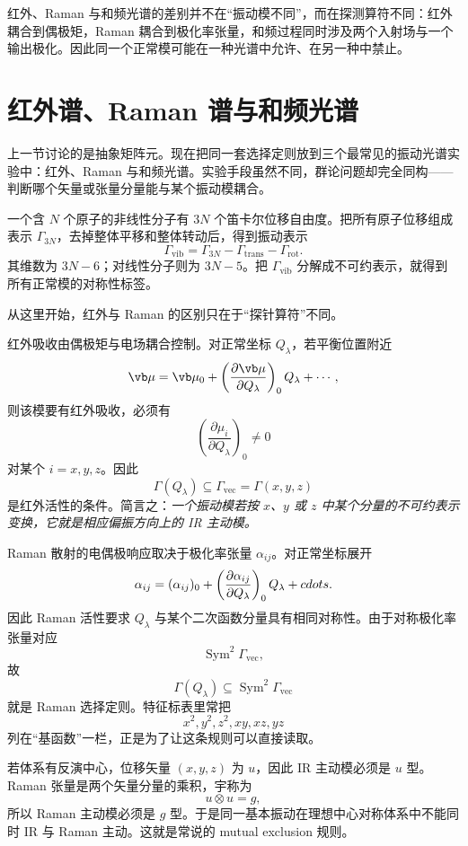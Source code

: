 红外、Raman 与和频光谱的差别并不在“振动模不同”，而在探测算符不同：红外耦合到偶极矩，Raman 耦合到极化率张量，和频过程同时涉及两个入射场与一个输出极化。因此同一个正常模可能在一种光谱中允许、在另一种中禁止。

\section{红外谱、Raman 谱与和频光谱}
\label{sec:ir-raman-sfg}

上一节讨论的是抽象矩阵元。现在把同一套选择定则放到三个最常见的振动光谱实验中：红外、Raman 与和频光谱。实验手段虽然不同，群论问题却完全同构——判断哪个矢量或张量分量能与某个振动模耦合。

一个含 $N$ 个原子的非线性分子有 $3N$ 个笛卡尔位移自由度。把所有原子位移组成表示 $\Gamma_{3N}$，去掉整体平移和整体转动后，得到振动表示
\[
\Gamma_{\mathrm{vib}}
=\Gamma_{3N}-\Gamma_{\mathrm{trans}}-\Gamma_{\mathrm{rot}}.
\label{eq:vibrational-representation}
\]
其维数为 $3N-6$；对线性分子则为 $3N-5$。把 $\Gamma_{\mathrm{vib}}$ 分解成不可约表示，就得到所有正常模的对称性标签。

从这里开始，红外与 Raman 的区别只在于“探针算符”不同。

红外吸收由偶极矩与电场耦合控制。对正常坐标 $Q_\lambda$，若平衡位置附近
\[
\vb\mu
=\vb\mu_0
+\left(\frac{\partial\vb\mu}{\partial Q_\lambda}\right)_0Q_\lambda+\cdots,
\]
则该模要有红外吸收，必须有
\[
\left(\frac{\partial\mu_i}{\partial Q_\lambda}\right)_0\neq0
\]
对某个 $i=x,y,z$。因此
\[
\Gamma(Q_\lambda)
\subseteq \Gamma_{\mathrm{vec}}
=\Gamma(x,y,z)
\]
是红外活性的条件。简言之：\emph{一个振动模若按 $x$、$y$ 或 $z$ 中某个分量的不可约表示变换，它就是相应偏振方向上的 IR 主动模。}

Raman 散射的电偶极响应取决于极化率张量 $\alpha_{ij}$。对正常坐标展开
\[
\alpha_{ij}
=(\alpha_{ij})_0
+\left(\frac{\partial\alpha_{ij}}{\partial Q_\lambda}\right)_0Q_\lambda+\\cdots.
\]
因此 Raman 活性要求 $Q_\lambda$ 与某个二次函数分量具有相同对称性。由于对称极化率张量对应
\[
\operatorname{Sym}^2\Gamma_{\mathrm{vec}},
\]
故
\[
\Gamma(Q_\lambda)
\subseteq\operatorname{Sym}^2\Gamma_{\mathrm{vec}}
\]
就是 Raman 选择定则。特征标表里常把
\[
x^2,y^2,z^2,xy,xz,yz
\]
列在“基函数”一栏，正是为了让这条规则可以直接读取。

\begin{proposition}[{中心对称体系的互斥规则}]
若体系有反演中心，位移矢量 $(x,y,z)$ 为 $u$，因此 IR 主动模必须是 $u$ 型。Raman 张量是两个矢量分量的乘积，宇称为
\[
u\otimes u=g,
\]
所以 Raman 主动模必须是 $g$ 型。于是同一基本振动在理想中心对称体系中不能同时 IR 与 Raman 主动。这就是常说的 mutual exclusion 规则。
\end{proposition}

